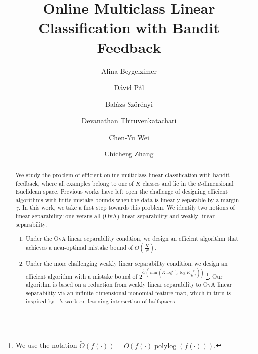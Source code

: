 \documentclass[12pt]{article}
\title{Online Multiclass Linear Classification with Bandit Feedback}
\author{
Alina Beygelzimer \and
D\'avid P\'al \and
Bal\'azs Sz\"or\'enyi \and
Devanathan Thiruvenkatachari \and
Chen-Yu Wei \and
Chicheng Zhang
}
\DeclareMathOperator*{\polylog}{polylog}
\begin{document}
\maketitle

\begin{abstract}
We study the problem of efficient online multiclass linear classification with bandit feedback, where all examples belong to one of $K$ classes and lie in the $d$-dimensional Euclidean space.
Previous works have left open the challenge of designing efficient algorithms with finite mistake bounds
when the data is linearly separable by a margin $\gamma$.
In this work, we take a first step towards this problem.
We identify two notions of linear separability:
one-versus-all (OvA) linear separability and weakly linear separability.
\begin{enumerate}
\item Under the OvA
linear separability condition, we design an efficient algorithm that achieves a near-optimal mistake bound of $O(\frac{K}{\gamma^2})$.
\item Under the more challenging weakly linear separability condition, we design an efficient algorithm with a mistake bound of $2^{\tilde{O}(\min(K \log^2 \frac 1 \gamma, \log K \sqrt{\frac 1 \gamma})) }$ \footnote{We use the notation $\tilde{O}(f(\cdot)) = O( f(\cdot) \polylog(f(\cdot)) )$.}.
Our algorithm is based on a reduction from weakly linear separability to OvA linear separability via an infinite dimensional monomial feature map, which in turn is inspired by ~\cite{Klivans-Servedio-2008}'s work on learning intersection of halfspaces.
\end{enumerate}



\end{abstract}
























\appendix


\end{document}
